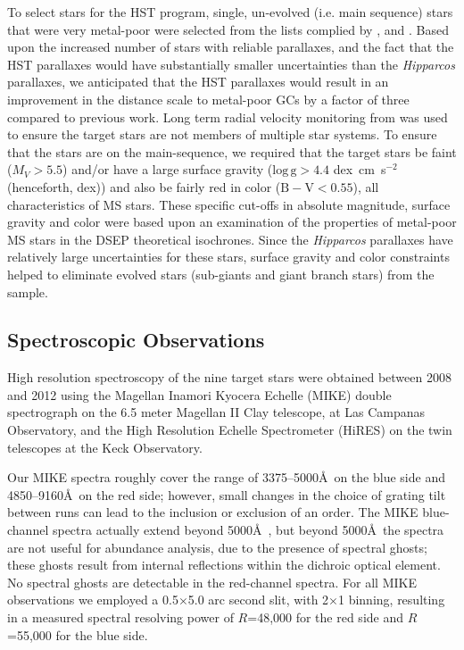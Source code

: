 \documentclass[revtex4]{emulateapj}
\begin{document}
To select stars for the HST program,  single, un-evolved (i.e. main sequence) stars that were very metal-poor were selected from the lists complied by \citet{Carr2000}, \citet{Grat2003} and \citet{Lath2002}. Based upon the increased number of stars with reliable parallaxes, and the fact that the HST parallaxes would have substantially smaller uncertainties than the \emph{Hipparcos} parallaxes, we anticipated that the HST parallaxes would result in an improvement in the distance scale to metal-poor GCs by a factor of three compared to previous work.  Long term radial velocity monitoring from \citet{Lath2002} was used to ensure the target stars are not members of multiple star systems. To ensure that the stars are on the main-sequence, we required that the target stars  be faint ($M_V>5.5$) and/or have a large surface gravity ($\mathrm{log\,g}>4.4$ dex~cm~s$^{-2}$ (henceforth, dex)) and also be fairly red in color ($\mathrm{B-V} < 0.55$), all characteristics of MS stars.   These specific cut-offs in absolute magnitude, surface gravity and color were based upon an examination of the properties of metal-poor MS stars in the DSEP theoretical isochrones.  Since the \emph{Hipparcos} parallaxes have relatively large uncertainties for these stars, surface gravity and color constraints helped to eliminate evolved stars (sub-giants and giant branch stars) from the sample.

\subsection{Spectroscopic Observations}
High resolution spectroscopy of the nine target stars were obtained between 2008 and 2012 using the Magellan Inamori Kyocera Echelle (MIKE) double spectrograph on the 6.5 meter Magellan II Clay telescope, at Las Campanas Observatory, and the High Resolution Echelle Spectrometer (HiRES) on the twin telescopes at the Keck Observatory.  

Our MIKE spectra roughly cover the range of 3375--5000\AA\ on the blue side and 4850--9160\AA\ on the red side; however, small changes in the choice of grating tilt between runs can lead to the inclusion or exclusion of an order.  The MIKE blue-channel spectra actually extend beyond 5000\AA\ , but beyond 5000\AA\ the spectra are not useful for abundance analysis, due to the presence of spectral ghosts; these ghosts result from internal reflections within the dichroic optical element. No spectral ghosts are detectable in the red-channel spectra.  For all MIKE observations we employed a 0.5$\times$5.0 arc second slit, with 2$\times$1 binning, resulting in a measured spectral resolving power of $R$=48,000 for the red side and $R$=55,000 for the blue side.
\end{document}
